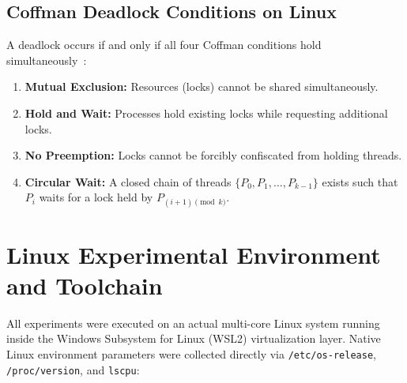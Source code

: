 \documentclass[11pt,a4paper]{article}
\begin{document}
\subsection{Coffman Deadlock Conditions on Linux}
A deadlock occurs if and only if all four Coffman conditions hold simultaneously~\cite{coffman}:
\begin{enumerate}
    \item \textbf{Mutual Exclusion:} Resources (locks) cannot be shared simultaneously.
    \item \textbf{Hold and Wait:} Processes hold existing locks while requesting additional locks.
    \item \textbf{No Preemption:} Locks cannot be forcibly confiscated from holding threads.
    \item \textbf{Circular Wait:} A closed chain of threads $\{P_0, P_1, \dots, P_{k-1}\}$ exists such that $P_i$ waits for a lock held by $P_{(i+1) \pmod k}$.
\end{enumerate}

\section{Linux Experimental Environment and Toolchain}

All experiments were executed on an actual multi-core Linux system running inside the Windows Subsystem for Linux (WSL2) virtualization layer. Native Linux environment parameters were collected directly via \texttt{/etc/os-release}, \texttt{/proc/version}, and \texttt{lscpu}:
\end{document}
